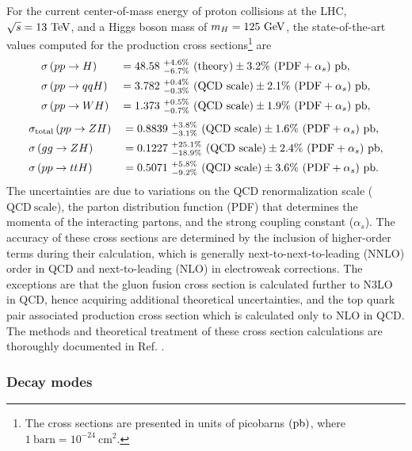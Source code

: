 For the current center-of-mass energy of proton collisions at the LHC, $\sqrt{s} = 13\ \mathrm{TeV}$, and a Higgs boson mass of $m_{H} = 125\ \mathrm{GeV}$, the state-of-the-art values computed for the production cross sections\footnote{The cross sections are presented in units of picobarns $(\mathrm{pb})$, where $1\ \mathrm{barn} = 10^{-24}\ \mathrm{cm}^{2}$.} are
\begin{alignat*}{2}
  &\sigma\left( pp \rightarrow H \right) &&= 48.58\ {}_{-6.7\%}^{+4.6\%} \ (\mathrm{theory}) \pm 3.2\%\ (\mathrm{PDF} + \alpha_{s})\ \mathrm{pb}, \\
  &\sigma\left( pp \rightarrow qqH \right) &&= 3.782\ {}_{-0.3\%}^{+0.4\%} \ (\mathrm{QCD\ scale}) \pm 2.1\%\ (\mathrm{PDF} + \alpha_{s})\ \mathrm{pb}, \\
  &\sigma\left( pp \rightarrow WH \right) &&= 1.373\ {}_{-0.7\%}^{+0.5\%} \ (\mathrm{QCD\ scale}) \pm 1.9\%\ (\mathrm{PDF} + \alpha_{s})\ \mathrm{pb},
\end{alignat*}
\begin{alignat*}{2}
  &\sigma_{\mathrm{total}}\left( pp \rightarrow ZH \right) &&= 0.8839\ {}_{-3.1\%}^{+3.8\%} \ (\mathrm{QCD\ scale}) \pm 1.6\%\ (\mathrm{PDF} + \alpha_{s})\ \mathrm{pb}, \\
  &\sigma\left( gg \rightarrow ZH \right) &&= 0.1227\ {}_{-18.9\%}^{+25.1\%} \ (\mathrm{QCD\ scale}) \pm 2.4\%\ (\mathrm{PDF} + \alpha_{s})\ \mathrm{pb}, \\
  &\sigma\left( pp \rightarrow ttH \right) &&= 0.5071\ {}_{-9.2\%}^{+5.8\%} \ (\mathrm{QCD\ scale}) \pm 3.6\%\ (\mathrm{PDF} + \alpha_{s})\ \mathrm{pb}.
\end{alignat*}
The uncertainties are due to variations on the QCD renormalization scale ($\mathrm{QCD\ scale}$), the parton distribution function (PDF) that determines the momenta of the interacting partons, and the strong coupling constant ($\alpha_{s}$). The accuracy of these cross sections are determined by the inclusion of higher-order terms during their calculation, which is generally next-to-next-to-leading (NNLO) order in QCD and next-to-leading (NLO) in electroweak corrections. The exceptions are that the gluon fusion cross section is calculated further to N3LO in QCD, hence acquiring additional theoretical uncertainties, and the top quark pair associated production cross section which is calculated only to NLO in QCD. The methods and theoretical treatment of these cross section calculations are thoroughly documented in Ref. \cite{CERNYR4}.

\subsubsection{Decay modes}

